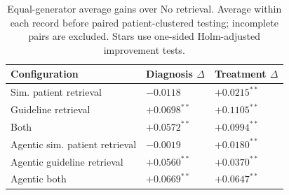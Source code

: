 \begin{table}[t]
\centering
\small
\begin{tabular}{lll}
\toprule
Configuration & Diagnosis $\Delta$ & Treatment $\Delta$ \\
\midrule
Sim. patient retrieval & $-0.0118$ & $+0.0215^{**}$ \\
Guideline retrieval & $+0.0698^{**}$ & $+0.1105^{**}$ \\
Both & $+0.0572^{**}$ & $+0.0994^{**}$ \\
Agentic sim. patient retrieval & $-0.0019$ & $+0.0180^{**}$ \\
Agentic guideline retrieval & $+0.0560^{**}$ & $+0.0370^{**}$ \\
Agentic both & $+0.0669^{**}$ & $+0.0647^{**}$ \\
\bottomrule
\end{tabular}
\caption{Equal-generator average gains over No retrieval. Average within each record before paired patient-clustered testing; incomplete pairs are excluded. Stars use one-sided Holm-adjusted improvement tests.}
\label{tab:retrieval-gains}
\end{table}
